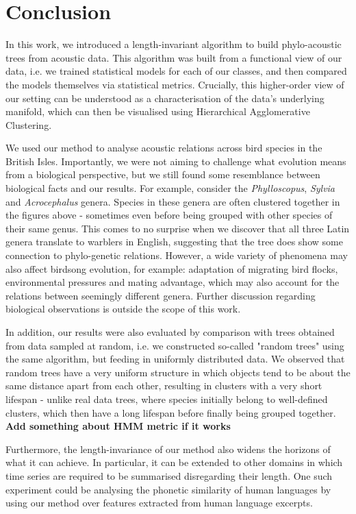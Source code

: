 \documentclass[pdftex,11pt,a4paper]{article}
\theoremstyle{definition}
\theoremstyle{remark}
\begin{document}
\section{Conclusion}
\label{section_conclusion}
In this work, we introduced a length-invariant algorithm to build phylo-acoustic trees from acoustic data. This algorithm was built from a functional view of our data, i.e. we trained statistical models for each of our classes, and then compared the models themselves via statistical metrics. Crucially, this higher-order view of our setting can be understood as a characterisation of the data's underlying manifold, which can then be visualised using Hierarchical Agglomerative Clustering. 
\par We used our method to analyse acoustic relations across bird species in the British Isles. Importantly, we were not aiming to challenge what evolution means from a biological perspective, but we still found some resemblance between biological facts and our results. For example, consider
the \emph{Phylloscopus}, \emph{Sylvia} and \emph{Acrocephalus} genera. Species in these genera are often clustered together in the figures above - sometimes even before being grouped with other species of their same genus. This comes to no surprise when we discover that all three Latin genera translate to warblers in English, suggesting that the tree does show some connection to phylo-genetic relations. However, a wide variety of phenomena may also affect birdsong evolution, for example: adaptation of migrating bird flocks, environmental pressures and mating advantage, which may also account for the relations between seemingly different genera. Further discussion regarding biological observations is outside the scope of this work. 
\par In addition, our results were also evaluated by comparison with trees obtained from data sampled at random, i.e. we constructed so-called "random trees" using the same algorithm, but feeding in uniformly distributed data. We observed that random trees have a very uniform structure in which objects tend to be about the same distance apart from each other, resulting in clusters with a very short lifespan - unlike real data trees, where species initially belong to well-defined clusters, which then have a long lifespan before finally being grouped together.
\textbf{Add something about HMM metric if it works}
\par Furthermore, the length-invariance of our method also widens the horizons of what it can achieve. In particular, it can be extended to other domains in which time series are required to be summarised disregarding their length. One such experiment could be analysing the phonetic similarity of human languages by using our method over features extracted from human language excerpts.
\end{document}
